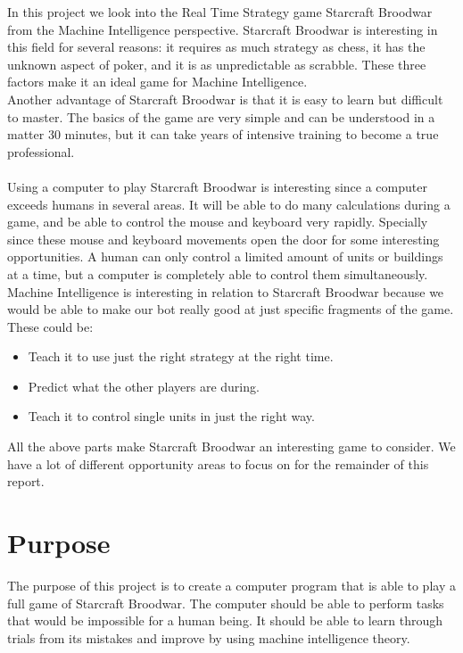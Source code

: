 In this project we look into the Real Time Strategy  game Starcraft Broodwar from the Machine Intelligence perspective. Starcraft Broodwar is interesting in this field for several reasons: it requires as much strategy as chess, it has the unknown aspect of poker, and it is as unpredictable as scrabble. These three factors make it an ideal game for Machine Intelligence.\\

Another advantage of Starcraft Broodwar is that it is easy to learn but difficult to master. The basics of the game are very simple and can be understood in a matter 30 minutes, but it can take years of intensive training to become a true professional. \\\\

Using a computer to play Starcraft Broodwar is interesting since a computer exceeds humans in several areas. It will be able to do many calculations during a game, and be able to control the mouse and keyboard very rapidly. Specially since these mouse and keyboard movements open the door for some interesting opportunities. A human can only control a limited amount of units or buildings at a time, but a computer is completely able to control them simultaneously. \\

Machine Intelligence is interesting in relation to Starcraft Broodwar because we would be able to make our bot really good at just specific fragments of the game. These could be:
\begin{itemize}
	\item Teach it to use just the right strategy at the right time.
	\item Predict what the other players are during.
	\item Teach it to control single units in just the right way.
\end{itemize}

All the above parts make Starcraft Broodwar an interesting game to consider. We have a lot of different opportunity areas to focus on for the remainder of this report.


\section{Purpose}

	The purpose of this project is to create a computer program that is able to play a full game of Starcraft Broodwar. The computer should be able to perform tasks that would be impossible for a human being. It should be able to learn through trials from its mistakes and improve by using machine intelligence theory. 


